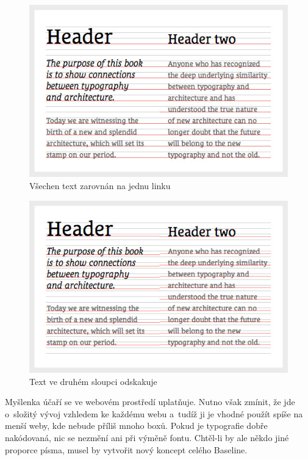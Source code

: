 \documentclass[thesis=B,czech]{FITthesis}[2012/06/26]
\begin{document}
\begin{figure}[h]
	\begin{center}
	\includegraphics[scale=0.6]{images/image10.jpg}
	\end{center}
	\caption[Myšlenka účaří]{Všechen text zarovnán na jednu linku\cite{bas}}
	\label{imgBa1}
\end{figure}
\begin{figure}[h]
	\begin{center}
	\includegraphics[scale=0.6]{images/image17.jpg}
	\end{center}
	\caption[Neuplatněná myšlenka účaří]{Text ve druhém sloupci odskakuje\cite{bas}}
	\label{imgBa2}
\end{figure}


Myšlenka účaří se ve webovém prostředí uplatňuje. Nutno však zmínit, že jde o~složitý vývoj vzhledem ke každému webu a~tudíž ji je vhodné použít spíše na menší weby, kde nebude příliš mnoho boxů. Pokud je typografie dobře nakódovaná, nic se nezmění ani při výměně fontu. Chtěl-li by ale někdo jiné proporce písma, musel by vytvořit nový koncept celého Baseline.
\end{document}
